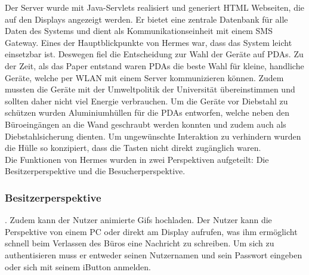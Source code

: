 Der Server wurde mit Java-Servlets realisiert und generiert HTML Webseiten, die auf den Displays angezeigt werden. Er bietet eine zentrale Datenbank für alle Daten des Systems und dient als Kommunikationseinheit mit einem SMS Gateway.
Eines der Hauptblickpunkte von Hermes war, dass das System leicht einsetzbar ist. Deswegen fiel die Entscheidung zur Wahl der Geräte auf PDAs. Zu der Zeit, als das Paper entstand waren PDAs die beste Wahl für kleine, handliche Geräte, welche per WLAN mit einem Server kommunizieren können. Zudem mussten die Geräte mit der Umweltpolitik der Universität übereinstimmen und sollten daher nicht viel Energie verbrauchen.
Um die Geräte vor Diebstahl zu schützen wurden Aluminiumhüllen für die PDAs entworfen, welche neben den Büroeingängen an die Wand geschraubt werden konnten und zudem auch als Diebstahlsicherung dienten. Um ungewünschte Interaktion zu verhindern wurden die Hülle so konzipiert, dass die Tasten nicht direkt zugänglich waren.
\\
Die Funktionen von Hermes wurden in zwei Perspektiven aufgeteilt: Die Besitzerperspektive und die Besucherperspektive.
\subsubsection{Besitzerperspektive}
. Zudem kann der Nutzer animierte Gifs hochladen.
Der Nutzer kann die Perspektive von einem PC oder direkt am Display aufrufen, was ihm ermöglicht schnell beim Verlassen des Büros eine Nachricht zu schreiben. Um sich zu authentisieren muss er entweder seinen Nutzernamen und sein Passwort eingeben oder sich mit seinem iButton anmelden.
